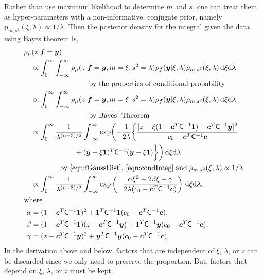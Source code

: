 \documentclass{iitthesis}          %
\newcommand{\bm}[1]{\boldsymbol{#1}}
\newcommand{\D}[1]{\text{d}{#1}}
\newcommand{\vc}{\bm{c}}
\newcommand{\vf}{\bm{f}}
\newcommand{\vrho}{\bm{\rho}}
\newcommand{\vy}{\bm{y}}
\newcommand{\vone}{\bm{1}}
\newcommand{\mC}{\mathsf{C}}
\begin{document}
Rather than use maximum likelihood to determine $m$ and $s$, one can treat them as hyper-parameters with a non-informative, conjugate prior, namely $\vrho_{m,s^2}(\xi, \lambda) \propto 1/\lambda$. Then the posterior density for the integral given the data using Bayes theorem is,
\begin{align*}
\MoveEqLeft[1]{\rho_{\mu}(z | \vf = \vy)} \\
& \propto \int_{0}^\infty \int_{-\infty}^\infty \rho_{\mu}(z | \vf = \vy, m = \xi, s^2 = \lambda)  \rho_{\vf}(\vy | \xi, \lambda ) \rho_{m, s^2}(\xi, \lambda) \, \D \xi \D \lambda \\
&\qquad \qquad \qquad \qquad \text{by the properties of conditional probability} \\
& \propto \int_{0}^\infty \int_{-\infty}^\infty \rho_{\mu}(z | \vf = \vy, m = \xi, s^2 = \lambda)  \rho_{\vf}(\vy | \xi, \lambda ) \rho_{m, s^2}(\xi, \lambda) \, \D \xi \D \lambda \\
&\qquad \qquad \qquad \qquad \text{by Bayes' Theorem} \\
& \propto \displaystyle \int_{0}^\infty  \frac{1}{\lambda^{(n+3)/2}} 
 \int_{-\infty}^\infty  \exp \biggl( -\frac{1}{2\lambda}\biggl\{
\frac{
[z - \xi (1 - \vc^T \mC^{-1} \vone)  -  \vc^T \mC^{-1} \vy]^2}
{c_0  -\vc ^T \mC^{-1} \vc}  \\
& \qquad \qquad \qquad  + (\vy - \xi \vone)^T \mC^{-1}(\vy - \xi \vone) \biggr \} \biggr) \, \D \xi \D \lambda \\
&\qquad \qquad
\text{by \eqref{eqn:fGaussDist}, \eqref{eqn:condInteg}} \; \text{and} \; \rho_{m,s^2}(\xi,\lambda) \propto 1/\lambda \\
& \propto \displaystyle \int_{0}^\infty  \frac{1}{\lambda^{(n+3)/2}} \int_{-\infty}^\infty  \exp\left( -\frac{\alpha \xi^2 -2 \beta \xi + \gamma}{2\lambda(c_0  -\vc ^T \mC^{-1} \vc)} \right) \, \D \xi \D \lambda, \\
\intertext{where}
\alpha & = (1 - \vc^T \mC^{-1} \vone)^2 + \vone^T \mC^{-1} \vone (c_0  -\vc ^T \mC^{-1} \vc),\\
\beta & =(1 - \vc^T \mC^{-1} \vone)(z - \vc^T \mC^{-1} \vy )
  + \vone^T \mC^{-1} \vy (c_0  -\vc ^T \mC^{-1} \vc),\\
\gamma &  = (z - \vc^T \mC^{-1} \vy )^2  + \vy^T \mC^{-1} \vy (c_0  -\vc ^T \mC^{-1} \vc).
\end{align*}
In the derivation above and below, factors that are independent of $\xi$, $\lambda$, or $z$ can be discarded since we only need to preserve the proportion.  But, factors that depend on $\xi$, $\lambda$, or $z$ must be kept.  
\end{document}
